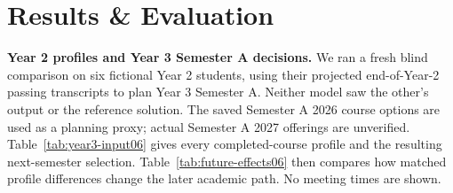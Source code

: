 \documentclass{article}
\begin{document}
\newpage
\section{Results \& Evaluation}

\textbf{Year 2 profiles and Year 3 Semester A decisions.} We ran a fresh blind comparison on six fictional Year 2 students, using their projected end-of-Year-2 passing transcripts to plan Year 3 Semester A. Neither model saw the other's output or the reference solution. The saved Semester A 2026 course options are used as a planning proxy; actual Semester A 2027 offerings are unverified. Table~\ref{tab:year3-input06} gives every completed-course profile and the resulting next-semester selection. Table~\ref{tab:future-effects06} then compares how matched profile differences change the later academic path. No meeting times are shown.
\end{document}
